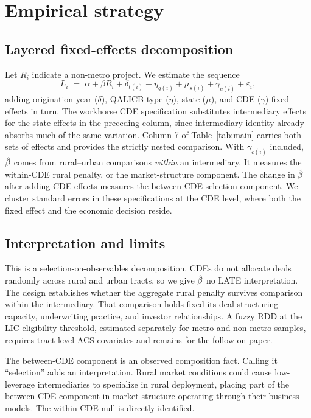 \section{Empirical strategy}\label{sec:strategy}

\subsection{Layered fixed-effects decomposition}

Let $R_i$ indicate a non-metro project. We estimate the sequence
\[
L_i \;=\; \alpha + \beta R_i + \delta_{t(i)} + \eta_{q(i)} + \mu_{s(i)}
+ \gamma_{c(i)} + \varepsilon_i,
\]
adding origination-year ($\delta$), QALICB-type ($\eta$), state ($\mu$),
and CDE ($\gamma$) fixed effects in turn. The workhorse CDE specification
substitutes intermediary effects for the state effects in the preceding
column, since intermediary identity already absorbs much of the same
variation. Column 7 of Table~\ref{tab:main} carries both sets of effects and
provides the strictly nested comparison. With $\gamma_{c(i)}$ included,
$\hat{\beta}$ comes from rural--urban comparisons \emph{within} an intermediary.
It measures the within-CDE rural penalty, or the market-structure component.
The change in $\hat{\beta}$ after adding CDE effects measures the between-CDE
selection component. We cluster standard errors in these specifications at
the CDE level, where both the fixed effect and the economic decision reside.

\subsection{Interpretation and limits}

This is a selection-on-observables decomposition. CDEs do not allocate deals
randomly across rural and urban tracts, so we give $\hat{\beta}$ no LATE
interpretation. The design establishes whether the aggregate rural penalty
survives comparison within the intermediary. That comparison holds fixed
its deal-structuring capacity, underwriting practice, and investor
relationships. A fuzzy RDD at the LIC eligibility threshold, estimated
separately for metro and non-metro samples, requires tract-level ACS
covariates and remains for the follow-on paper.

The between-CDE component is an observed composition fact. Calling it
``selection'' adds an interpretation. Rural market conditions could cause
low-leverage intermediaries to specialize in rural deployment, placing part
of the between-CDE component in market structure operating through their
business models. The within-CDE null is directly identified.

